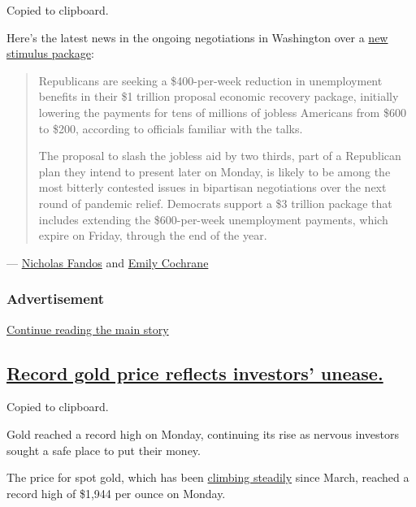 Copied to clipboard.

Here's the latest news in the ongoing negotiations in Washington over a
\href{https://www.nytimes.com/2020/07/23/business/economy/unemployment-benefits.html}{new
stimulus package}:

\begin{quote}
Republicans are seeking a \$400-per-week reduction in unemployment
benefits in their \$1 trillion proposal economic recovery package,
initially lowering the payments for tens of millions of jobless
Americans from \$600 to \$200, according to officials familiar with the
talks.

The proposal to slash the jobless aid by two thirds, part of a
Republican plan they intend to present later on Monday, is likely to be
among the most bitterly contested issues in bipartisan negotiations over
the next round of pandemic relief. Democrats support a \$3 trillion
package that includes extending the \$600-per-week unemployment
payments, which expire on Friday, through the end of the year.
\end{quote}

--- \href{https://www.nytimes.com/by/nicholas-fandos}{Nicholas Fandos}
and \href{https://www.nytimes.com/by/emily-cochrane}{Emily Cochrane}

\hypertarget{advertisement-2}{%
\subsubsection{Advertisement}\label{advertisement-2}}

\protect\hyperlink{after-dfp-ad-mid3}{Continue reading the main story}

\hypertarget{record-gold-price-reflects-investors-unease}{%
\subsection{\texorpdfstring{\protect\hyperlink{record-gold-price-reflects-investors-unease}{Record
gold price reflects investors'
unease.}}{Record gold price reflects investors' unease.}}\label{record-gold-price-reflects-investors-unease}}

Copied to clipboard.

Gold reached a record high on Monday, continuing its rise as nervous
investors sought a safe place to put their money.

The price for spot gold, which has been
\href{https://www.nytimes.com/live/2020/07/24/business/stock-market-updates-coronavirus\#stocks-fall-and-gold-rallies-as-uncertainty-ripples-through-wall-street}{climbing
steadily} since March, reached a record high of \$1,944 per ounce on
Monday.

